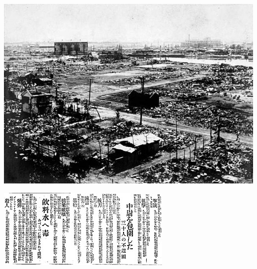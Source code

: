 \documentclass[11pt,a4j,twocolumn]{jarticle}
\begin{document}
\vfill
\centerline{\includegraphics[width=\columnwidth,bb=0 0 640 461]{earthquake1923.jpg}}

\bigskip
\centerline{\includegraphics[width=\columnwidth,bb=0 0 320 146]{fakenews.jpg}}
\end{document}
